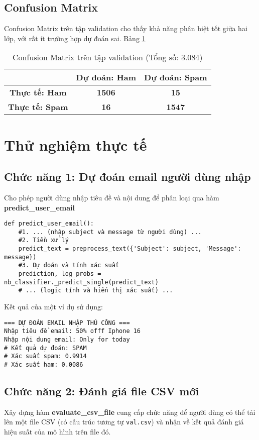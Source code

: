 \subsection{Confusion Matrix}
Confusion Matrix trên tập validation cho thấy khả năng phân biệt tốt giữa hai lớp, với rất ít trường hợp dự đoán sai. Bảng \ref{fig:confusion_matrix}

\begin{table}[H]
\centering
\begin{tabular}{|c|c|c|}
\hline
& \textbf{Dự đoán: Ham} & \textbf{Dự đoán: Spam} \\
\hline
\textbf{Thực tế: Ham} & \textbf{1506} & \textbf{15} \\
\hline
\textbf{Thực tế: Spam} & \textbf{16} & \textbf{1547} \\
\hline
\end{tabular}
\caption{Confusion Matrix trên tập validation (Tổng số: 3.084)}
\label{fig:confusion_matrix}
\end{table}

\section{Thử nghiệm thực tế}

\subsection{Chức năng 1: Dự đoán email người dùng nhập}
Cho phép người dùng nhập tiêu đề và nội dung để phân loại qua hàm \textbf{predict\_user\_email}
\begin{verbatim}
def predict_user_email():
    #1. ... (nhập subject và message từ người dùng) ...
    #2. Tiền xử lý
    predict_text = preprocess_text({'Subject': subject, 'Message': message})
    #3. Dự đoán và tính xác suất
    prediction, log_probs = nb_classifier._predict_single(predict_text)
    # ... (logic tính và hiển thị xác suất) ...
\end{verbatim}

Kết quả của một ví dụ sử dụng:
\begin{verbatim}
=== DỰ ĐOÁN EMAIL NHẬP THỦ CÔNG ===
Nhập tiêu đề email: 50% offf Iphone 16
Nhập nội dung email: Only for today
# Kết quả dự đoán: SPAM
# Xác suất spam: 0.9914
# Xác suất ham: 0.0086
\end{verbatim}

\subsection{Chức năng 2: Đánh giá file CSV mới}
Xây dựng hàm \textbf{evaluate\_csv\_file} cung cấp chức năng để người dùng có thể tải lên một file CSV (có cấu trúc tương tự \texttt{val.csv}) và nhận về kết quả đánh giá hiệu suất của mô hình trên file đó.

